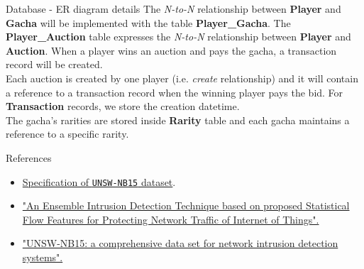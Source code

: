 \documentclass[12pt,aspectratio=169,notheorems]{beamer}
\begin{document}
\begin{frame}{Database - ER diagram details}
    The \emph{N-to-N} relationship between \textbf{Player} and \textbf{Gacha} will be implemented with the table \textbf{Player\_Gacha}. The \textbf{Player\_Auction} table expresses the \emph{N-to-N} relationship between \textbf{Player} and \textbf{Auction}. When a player wins an auction and pays the gacha, a transaction record will be created. \\[1ex]
    Each auction is created by one player (i.e. \emph{create} relationship) and it will contain a reference to a transaction record when the winning player pays the bid. For \textbf{Transaction} records, we store the creation datetime. \\[1ex]
    The gacha's rarities are stored inside \textbf{Rarity} table and each gacha maintains a reference to a specific rarity.
\end{frame}

\begin{frame}{References}
    \begin{itemize}
        \small
        \item \href{https://unsw-my.sharepoint.com/personal/z5025758_ad_unsw_edu_au/_layouts/15/onedrive.aspx?id=\%2Fpersonal\%2Fz5025758\%5Fad\%5Funsw\%5Fedu\%5Fau\%2FDocuments\%2FUNSW\%2DNB15\%20dataset&ga=1}{Specification of \texttt{UNSW-NB15} dataset}.
        \item \href{https://ieeexplore.ieee.org/abstract/document/8470090}{"An Ensemble Intrusion Detection Technique based on proposed Statistical Flow Features for Protecting Network Traffic of Internet of Things".}
        \item \href{https://ieeexplore.ieee.org/abstract/document/7348942}{"UNSW-NB15: a comprehensive data set for network intrusion detection systems".}
    \end{itemize}   
\end{frame}
\end{document}

